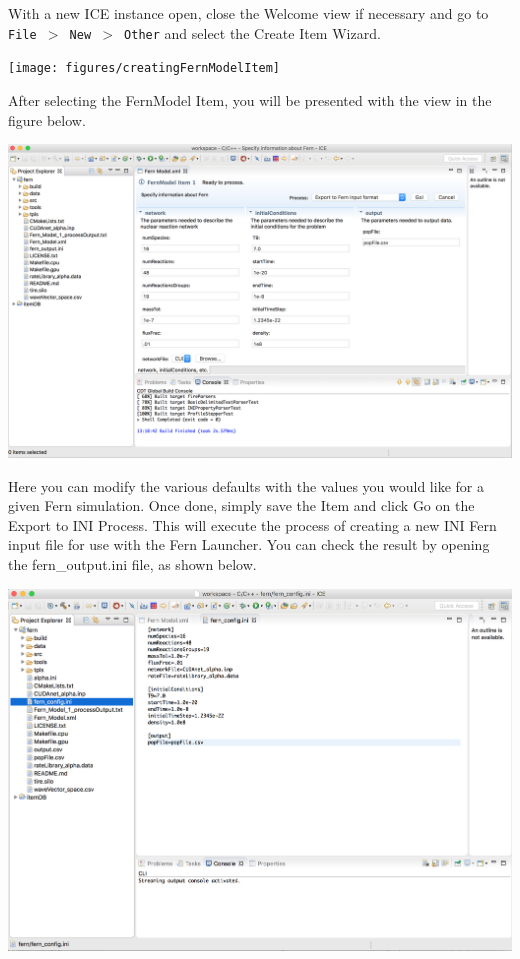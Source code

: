 With a new ICE instance open, close the Welcome view if necessary and go to
\texttt{File $>$ New $>$ Other} and select the Create Item Wizard. 
\begin{center} \texttt{[image: figures/creatingFernModelItem]}
\end{center}
After selecting the FernModel Item, you will be presented with the view in the
figure below. 
\begin{center} \includegraphics[width=\textwidth]{figures/fernmodelItem}
\end{center}
Here you can modify the various defaults with the values you would like for a
given Fern simulation. Once done, simply save the Item and click Go on the
Export to INI Process. This will execute the process of creating a new INI Fern
input file for use with the Fern Launcher. You can check the result by opening
the fern\_output.ini file, as shown below. 
\begin{center} \includegraphics[width=\textwidth]{figures/result}
\end{center}

